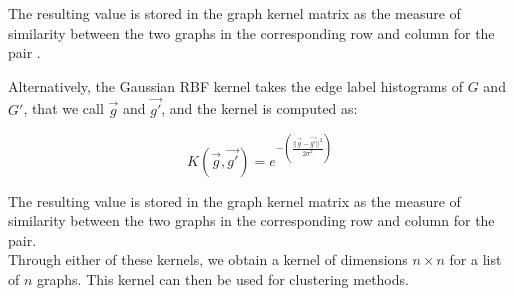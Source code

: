 The resulting value is stored in the graph kernel matrix as the measure of similarity between the two graphs in the corresponding row and column for the pair \cite{sugiyama2015halting}.

Alternatively, the Gaussian RBF kernel takes the edge label histograms of $G$ and $G'$, that we call $\vec{g}$ and $\vec{g'}$, and the kernel is computed as:

$$K(\vec{g},\vec{g'}) = e^{-(\frac{||\vec{g}- \vec{g'}||^2}{2 \sigma^2})}$$

The resulting value is stored in the graph kernel matrix as the measure of similarity between the two graphs in the corresponding row and column for the pair.\\

Through either of these kernels, we obtain a kernel of dimensions $n \times n$ for a list of $n$ graphs. This kernel can then be used for clustering methods.



